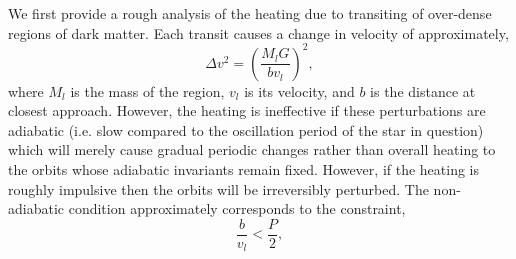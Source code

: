 \documentclass[usenatbib]{mnras}
\begin{document}
We first provide a rough analysis of the heating due to transiting of over-dense regions of dark matter. Each transit causes a change in velocity of approximately,
\begin{equation}
\Delta v^2 = \left( \frac{M_l G}{b v_l} \right)^2,
\end{equation}
where $M_l$ is the mass of the region, $v_l$ is its velocity, and $b$ is the distance at closest approach. However, the heating is ineffective if these perturbations are adiabatic (i.e. slow compared to the oscillation period of the star in question) which will merely cause gradual periodic changes rather than overall heating to the orbits whose adiabatic invariants remain fixed. However, if the heating is roughly impulsive then the orbits will be irreversibly perturbed. The non-adiabatic condition approximately corresponds to the constraint,
\begin{equation} \label{adiabatic}
\frac{b}{v_l} < \frac{P}{2},
\end{equation}
\end{document}
